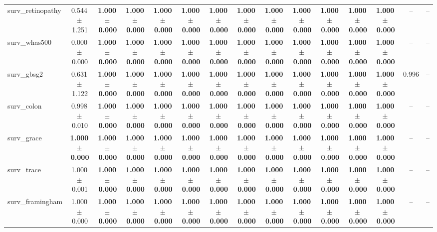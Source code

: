 \documentclass[8pt]{extarticle}
\begin{document}
\begin{longtable}{l*{14}{c}}
surv\_retinopathy & 0.544\,$\pm$\,1.251 & \textbf{1.000\,$\pm$\,0.000} & \textbf{1.000\,$\pm$\,0.000} & \textbf{1.000\,$\pm$\,0.000} & \textbf{1.000\,$\pm$\,0.000} & \textbf{1.000\,$\pm$\,0.000} & \textbf{1.000\,$\pm$\,0.000} & \textbf{1.000\,$\pm$\,0.000} & \textbf{1.000\,$\pm$\,0.000} & \textbf{1.000\,$\pm$\,0.000} & \textbf{1.000\,$\pm$\,0.000} & \textbf{1.000\,$\pm$\,0.000} & -- & -- \\
surv\_whas500 & 0.000\,$\pm$\,0.000 & \textbf{1.000\,$\pm$\,0.000} & \textbf{1.000\,$\pm$\,0.000} & \textbf{1.000\,$\pm$\,0.000} & \textbf{1.000\,$\pm$\,0.000} & \textbf{1.000\,$\pm$\,0.000} & \textbf{1.000\,$\pm$\,0.000} & \textbf{1.000\,$\pm$\,0.000} & \textbf{1.000\,$\pm$\,0.000} & \textbf{1.000\,$\pm$\,0.000} & \textbf{1.000\,$\pm$\,0.000} & \textbf{1.000\,$\pm$\,0.000} & -- & -- \\
surv\_gbsg2 & 0.631\,$\pm$\,1.122 & \textbf{1.000\,$\pm$\,0.000} & \textbf{1.000\,$\pm$\,0.000} & \textbf{1.000\,$\pm$\,0.000} & \textbf{1.000\,$\pm$\,0.000} & \textbf{1.000\,$\pm$\,0.000} & \textbf{1.000\,$\pm$\,0.000} & \textbf{1.000\,$\pm$\,0.000} & \textbf{1.000\,$\pm$\,0.000} & \textbf{1.000\,$\pm$\,0.000} & \textbf{1.000\,$\pm$\,0.000} & \textbf{1.000\,$\pm$\,0.000} & 0.996 & -- \\
surv\_colon & 0.998\,$\pm$\,0.010 & \textbf{1.000\,$\pm$\,0.000} & \textbf{1.000\,$\pm$\,0.000} & \textbf{1.000\,$\pm$\,0.000} & \textbf{1.000\,$\pm$\,0.000} & \textbf{1.000\,$\pm$\,0.000} & \textbf{1.000\,$\pm$\,0.000} & \textbf{1.000\,$\pm$\,0.000} & \textbf{1.000\,$\pm$\,0.000} & \textbf{1.000\,$\pm$\,0.000} & \textbf{1.000\,$\pm$\,0.000} & \textbf{1.000\,$\pm$\,0.000} & -- & -- \\
surv\_grace & \textbf{1.000\,$\pm$\,0.000} & \textbf{1.000\,$\pm$\,0.000} & \textbf{1.000\,$\pm$\,0.000} & \textbf{1.000\,$\pm$\,0.000} & \textbf{1.000\,$\pm$\,0.000} & \textbf{1.000\,$\pm$\,0.000} & \textbf{1.000\,$\pm$\,0.000} & \textbf{1.000\,$\pm$\,0.000} & \textbf{1.000\,$\pm$\,0.000} & \textbf{1.000\,$\pm$\,0.000} & \textbf{1.000\,$\pm$\,0.000} & \textbf{1.000\,$\pm$\,0.000} & -- & -- \\
surv\_trace & 1.000\,$\pm$\,0.001 & \textbf{1.000\,$\pm$\,0.000} & \textbf{1.000\,$\pm$\,0.000} & \textbf{1.000\,$\pm$\,0.000} & \textbf{1.000\,$\pm$\,0.000} & \textbf{1.000\,$\pm$\,0.000} & \textbf{1.000\,$\pm$\,0.000} & \textbf{1.000\,$\pm$\,0.000} & \textbf{1.000\,$\pm$\,0.000} & \textbf{1.000\,$\pm$\,0.000} & \textbf{1.000\,$\pm$\,0.000} & \textbf{1.000\,$\pm$\,0.000} & -- & -- \\
surv\_framingham & 1.000\,$\pm$\,0.000 & \textbf{1.000\,$\pm$\,0.000} & \textbf{1.000\,$\pm$\,0.000} & \textbf{1.000\,$\pm$\,0.000} & \textbf{1.000\,$\pm$\,0.000} & \textbf{1.000\,$\pm$\,0.000} & \textbf{1.000\,$\pm$\,0.000} & \textbf{1.000\,$\pm$\,0.000} & \textbf{1.000\,$\pm$\,0.000} & \textbf{1.000\,$\pm$\,0.000} & \textbf{1.000\,$\pm$\,0.000} & \textbf{1.000\,$\pm$\,0.000} & -- & -- \\

\end{longtable}
\end{document}
